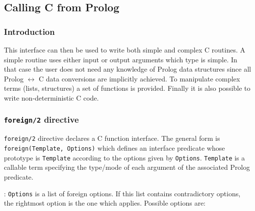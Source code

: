 \subsection{Calling C from Prolog}
\label{Calling-C-from-Prolog}

\subsubsection{Introduction}

This interface can then be used to write both simple and complex C routines.
A simple routine uses either input or output arguments which type is simple.
In that case the user does not need any knowledge of Prolog data structures
since all Prolog $\leftrightarrow$ C data conversions are implicitly
achieved. To manipulate complex terms (lists, structures) a set of functions
is provided. Finally it is also possible to write non-deterministic C code.

\subsubsection{\texttt{foreign/2} directive}
\label{foreign/2-directive}

\texttt{foreign/2} directive  declares a C function interface.
The general form is \texttt{foreign(Template, Options)} which defines an
interface predicate whose prototype is \texttt{Template} according to the
options given by \texttt{Options}. \texttt{Template} is a callable term
specifying the type/mode of each argument of the associated Prolog predicate.

: \texttt{Options} is a list of foreign options. If
this list contains contradictory options, the rightmost option is the one
which applies. Possible options are:

